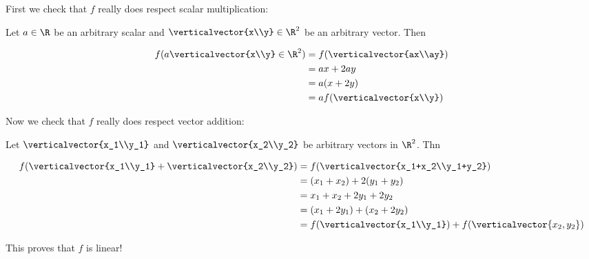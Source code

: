 \documentclass{ximera}
\begin{document}
\begin{question}
\begin{solution}
\begin{hint}
\begin{question}
		First we check that $f$ really does respect scalar multiplication:
		
		Let $a \in \R$ be an arbitrary scalar and $\verticalvector{x\\y} \in \R^2$ be an arbitrary vector.  Then
		
		\begin{align*}
		 f(a\verticalvector{x\\y} \in \R^2) &= f(\verticalvector{ax\\ay})\\
		 &= ax+2ay\\
		 &= a(x+2y)\\
		 &=af(\verticalvector{x\\y}) 		
		 \end{align*}
		 
		 Now we check that $f$ really does respect vector addition:
		 
		 Let $\verticalvector{x_1\\y_1}$ and $\verticalvector{x_2\\y_2}$ be arbitrary vectors in $\R^2$.  Thn
		 
		 \begin{align*}
		 f(\verticalvector{x_1\\y_1}+\verticalvector{x_2\\y_2})&= f(\verticalvector{x_1+x_2\\y_1+y_2})\\
		 &= (x_1+x_2)+2(y_1+y_2)\\
		 &= x_1+x_2+2y_1+2y_2\\
		 &=(x_1+2y_1)+(x_2+2y_2)\\
		 &=f(\verticalvector{x_1\\y_1})+f(\verticalvector{x_2,y_2})
		 \end{align*}
		 
		 This proves that $f$ is linear!
		
	\end{question}
	
    \end{hint}
    \begin{multiple-choice}

    \end{multiple-choice}
  \end{solution}


\end{question}
\end{document}
